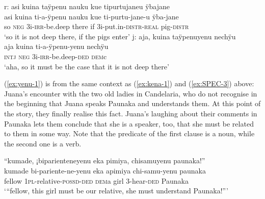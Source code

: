 \ea\label{ex:yenu-2}
  \ea\label{ex:yenu-2.1}
\begingl
\glpreamble \textup{r:} asi kuina taÿpenu nauku kue tipurtujaneu ÿbajane\\
\gla asi kuina ti-a-ÿpenu nauku kue ti-purtu-jane-u ÿba-jane\\ 
\glb so \textsc{neg} 3i-\textsc{irr}-be.deep there if 3i-put.in-\textsc{distr}-\textsc{real} pig-\textsc{distr}\\ 
\glft ‘so it is not deep there, if the pigs enter’
  \ex\label{ex:yenu-2.2}
\begingl
\glpreamble \textup{j:} aja, kuina taÿpenuyenu nechÿu\\
\gla aja kuina ti-a-ÿpenu-yenu nechÿu\\
\glb \textsc{intj} \textsc{neg} 3i-\textsc{irr}-be.deep-\textsc{ded} \textsc{dem}c\\
\glft ‘aha, so it must be the case that it is not deep there’
\endgl
{}
\z
\xe


(\ref{ex:yenu-1}) is from the same context as (\ref{ex:kena-1}) and (\ref{ex:SPEC-3}) above: Juana’s encounter with the two old ladies in Candelaria, who do not recognise in the beginning that Juana speaks Paunaka and understands them. At this point of the story, they finally realise this fact.  Juana’s laughing about their comments in Paunaka lets them conclude that she is a speaker, too, that she must be related to them in some way. Note that the predicate of the first clause is a noun, while the second one is a verb.

\ea\label{ex:yenu-1}
\begingl 
\glpreamble “kumade, ¡biparienteneyenu eka pimiya, chisamuyenu paunaka!”\\
\gla kumade bi-pariente-ne-yenu eka apimiya chi-samu-yenu paunaka\\ 
\glb fellow 1\textsc{pl}-relative-\textsc{possd}-\textsc{ded} \textsc{dem}a girl 3-hear-\textsc{ded} Paunaka\\ 
\glft ‘“fellow, this girl must be our relative, she must understand Paunaka!”’
\trailingcitation{[jxx-p120515l-1.108]}
\xe


